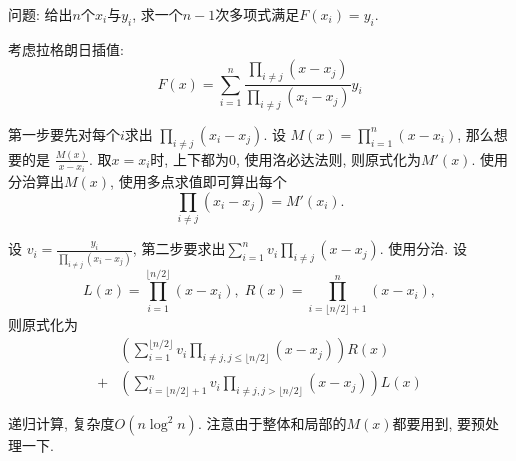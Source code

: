问题: 给出$n$个$x_i$与$y_i$, 求一个$n-1$次多项式满足$F(x_i)=y_i$.

考虑拉格朗日插值: 
$$F(x)=\sum_{i=1}^n\frac{\prod_{i\neq j}(x-x_j)}{\prod_{i\neq j}(x_i-x_j)}y_i$$

第一步要先对每个$i$求出 $\prod_{i\neq j}(x_i-x_j)$. 设 $M(x)=\prod_{i=1}^{n}(x-x_i)$, 那么想要的是 $\frac{M(x)}{x-x_i}$.  取$x=x_i$时, 上下都为0, 使用洛必达法则, 则原式化为$M'(x)$.  使用分治算出$M(x)$, 使用多点求值即可算出每个
$$\prod_{i\neq j}(x_i-x_j)=M'(x_i).$$

设 $v_i = \frac{y_i}{\prod_{i\neq j}(x_i-x_j)}$, 第二步要求出$\sum_{i=1}^{n}v_i\prod_{i\neq j}(x-x_j)$. 使用分治. 设
$$L(x)=\prod_{i=1}^{\lfloor n/2\rfloor}(x-x_i), \; R(x)=\prod_{i=\lfloor n/2\rfloor+1}^n(x-x_i),$$
则原式化为
\begin{align*}
    &\left( \sum_{i=1}^{\lfloor n/2\rfloor}v_i\prod_{i\neq j,j\leq\lfloor n/2\rfloor}(x-x_j)\right)R(x) \\
    +& \left( \sum_{i=\lfloor n/2\rfloor+1}^{n}v_i\prod_{i\neq j,j>\lfloor n/2\rfloor}(x-x_j)\right)L(x)
\end{align*}

递归计算, 复杂度$O(n\log^2n)$. 注意由于整体和局部的$M(x)$都要用到, 要预处理一下.

\inputminted{cpp}{sections/Polynomial/assets/Math/快速插值.cpp}
